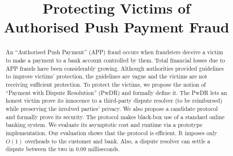 \documentclass[orivec]{llncs}
\begin{document}
\title{Protecting Victims of \\ Authorised Push Payment Fraud}
\author{}
\institute{}

\date{}
\maketitle{}


\begin{abstract}
An ``Authorised Push Payment'' (APP) fraud occurs when fraudsters deceive a victim  to make  a payment  to a bank account controlled by them.  Total financial losses due to  APP frauds have been considerably growing. Although  authorities   provided guidelines to  improve victims’ protection, the guidelines are  vague and  the victims are not receiving sufficient protection. To protect the  victims,  we propose the notion of ``Payment with Dispute Resolution'' (PwDR) and formally define it. The PwDR lets an honest victim  prove its innocence to a third-party dispute resolver  (to be reimbursed) while preserving the involved parties' privacy. We also propose a  candidate protocol  and formally prove its security. The protocol  makes black-box use of a standard online banking system. We evaluate its    asymptotic cost and   runtime  via a prototype implementation. Our evaluation shows that the protocol is  efficient. It imposes only $O(1)$ overheads to the customer and bank.  Also, a dispute resolver can  settle a dispute between the two  in $0.09$ milliseconds.


\end{abstract}








\appendix





\end{document}
